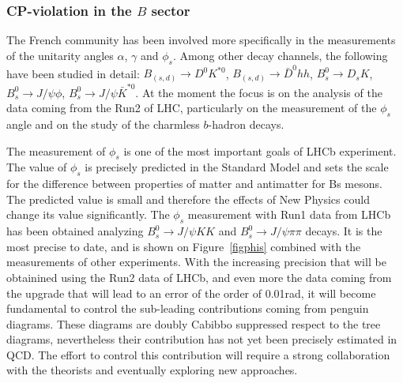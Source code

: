 \subsubsection*{CP-violation in the $B$ sector}
The French community has been involved more specifically in the measurements of the unitarity angles
$\alpha$, $\gamma$ and $\phi_{s}$. Among other decay channels, the following
have been studied in detail:
$B_{(s,d)}\to D^{0} K^{*0}$, $B_{(s,d)}\to\bar{D}^{0} hh$, $B^{0}_{s} \to
D_{s} K$, $B^{0}_{s} \to J/\psi\phi$,
$B^{0}_{s} \to J/\psi\bar{K}^{*0}$. 
At the moment the focus is on the analysis of the data coming from the Run2 of LHC, particularly on the measurement of the $\phi_{s}$ angle and on the study of the charmless $b$-hadron decays. 


The measurement of $\phi_{s}$ is one of the most important goals of LHCb experiment. The value of $\phi_{s}$ is precisely predicted in the Standard Model and sets the scale for the difference between properties of matter and antimatter for Bs mesons. The predicted value is small and therefore the effects of New Physics could change its value significantly. The $\phi_{s}$ measurement with Run1 data from LHCb has been obtained analyzing $B^{0}_{s} \to J/\psi K K$ and $B^{0}_{s} \to J/\psi \pi \pi$ decays. It  is the most precise to date, and is shown on Figure~\ref{figphis} combined with the measurements of other experiments. With the increasing precision that will be obtainined using the Run2 data of LHCb, and even more the data coming from the upgrade that will lead to an error of the order of 0.01rad, it will become fundamental to control the sub-leading contributions coming from penguin diagrams. These diagrams are doubly Cabibbo suppressed respect to the tree diagrams, nevertheless their contribution has not yet been precisely estimated in QCD.  The effort to control this contribution will require a strong collaboration with the theorists and eventually exploring new approaches. 


